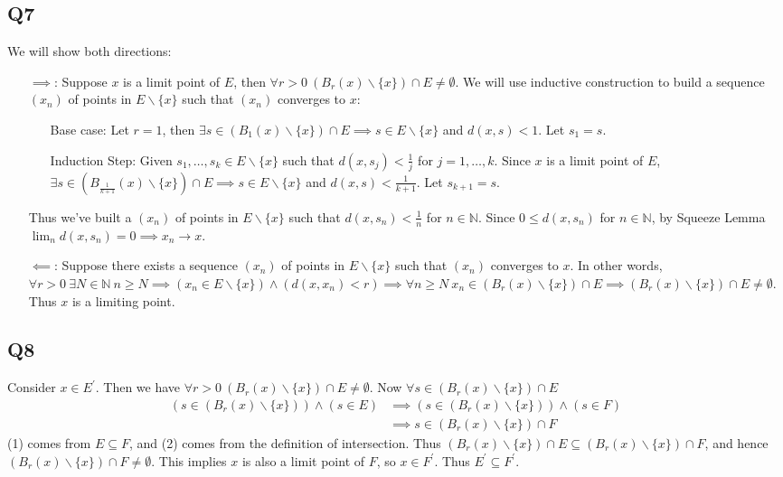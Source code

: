 \documentclass[12pt,lettersize]{article}
\newcommand{\N}{\mathbb{N}}
\begin{document}
	\subsection*{Q7}
	We will show both directions:
	\begin{itemize}
		\item[$\implies$:] Suppose $x$ is a limit point of $E$, then $\forall r>0\ (B_r(x)\backslash\{x\})\cap E\neq\emptyset$. We will use inductive construction to build a sequence $(x_n)$ of points in $E\backslash\{x\}$ such that $(x_n)$ converges to $x$:
		\begin{itemize}
			\item[Base case:] Let $r=1$, then $\exists s\in(B_1(x)\backslash\{x\})\cap E \implies s\in E\backslash\{x\}$ and $d(x,s)<1$. Let $s_1=s$.
			\item[Induction Step:] Given $s_1,\dots,s_k\in E\backslash\{x\}$ such that $d(x,s_j)<\frac{1}{j}$ for $j=1,\dots,k$. Since $x$ is a limit point of $E$, $\exists s\in(B_{\frac{1}{k+1}}(x)\backslash\{x\})\cap E\implies s\in E\backslash\{x\}$ and $d(x,s)<\frac{1}{k+1}$. Let $s_{k+1}=s$.
		\end{itemize}
		Thus we've built a $(x_n)$ of points in $E\backslash\{x\}$ such that $d(x,s_n)<\frac{1}{n}$ for $n\in\N$. Since $0\leq d(x,s_n)$ for $n\in\N$, by Squeeze Lemma $\lim_nd(x,s_n)=0\implies x_n\rightarrow x$.
		\item[$\impliedby$:] Suppose there exists a sequence $(x_n)$ of points in $E\backslash\{x\}$ such that $(x_n)$ converges to $x$. In other words, $\forall r>0\ \exists N\in\N\ n\geq N\implies (x_n\in E\backslash\{x\})\land (d(x,x_n)<r)\implies \forall n\geq N\ x_n\in (B_r(x)\backslash\{x\})\cap E\implies (B_r(x)\backslash\{x\})\cap E\neq\emptyset$. Thus $x$ is a limiting point.
	\end{itemize}
	\newpage
	
	\setcounter{equation}{0}
	\subsection*{Q8}
	Consider $x\in E^\prime$. Then we have $\forall r>0\ (B_r(x)\backslash\{x\})\cap E\neq\emptyset$. Now $\forall s\in(B_r(x)\backslash\{x\})\cap E$
	\begin{align}
		(s\in(B_r(x)\backslash\{x\}))\land(s\in E) &\implies (s\in(B_r(x)\backslash\{x\}))\land(s\in F)\\
												   &\implies s\in(B_r(x)\backslash\{x\})\cap F
	\end{align}
	(1) comes from $E\subseteq F$, and (2) comes from the definition of intersection. Thus $(B_r(x)\backslash\{x\})\cap E\subseteq (B_r(x)\backslash\{x\})\cap F$, and hence $(B_r(x)\backslash\{x\})\cap F\neq\emptyset$. This implies $x$ is also a limit point of $F$, so $x\in F^\prime$. Thus $E^\prime\subseteq F^\prime$.
	\newpage
	
\end{document}
